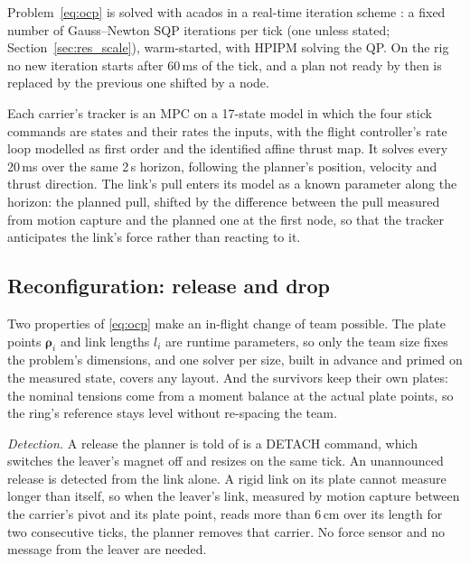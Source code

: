 Problem~\eqref{eq:ocp} is solved with acados \cite{verschueren2022acados} in a real-time iteration scheme
\cite{diehl2002rti}: a fixed number of Gauss--Newton SQP iterations per tick (one unless stated;
Section~\ref{sec:res_scale}), warm-started, with HPIPM \cite{frison2020hpipm}
solving the QP. On the rig no new iteration starts after 60\,ms of the tick, and a plan not ready by then is replaced
by the previous one shifted by a node.

Each carrier's tracker is an MPC on a 17-state model in which the four stick commands are states and their rates the
inputs, with the flight controller's rate loop modelled as first order and the identified affine thrust map. It
solves every 20\,ms over the same 2\,s horizon, following the planner's position, velocity and thrust direction. The
link's pull enters its model as a known parameter along the horizon: the planned pull, shifted by the difference
between the pull measured from motion capture and the planned one at the first node, so that the tracker anticipates
the link's force rather than reacting to it.

\subsection{Reconfiguration: release and drop}
\label{sec:reconfig}

Two properties of \eqref{eq:ocp} make an in-flight change of team possible. The plate points
$\boldsymbol{\rho}_i$ and link lengths $l_i$ are runtime parameters, so only the team size fixes the problem's
dimensions, and one solver per size, built in advance and primed on the measured state, covers any layout. And the
survivors keep their own plates: the nominal tensions come from a moment balance at the actual plate points, so the
ring's reference stays level without re-spacing the team.

\emph{Detection.} A release the planner is told of is a DETACH command, which switches the leaver's magnet off and
resizes on the same tick. An unannounced release is detected from the link alone. A rigid link on its plate cannot
measure longer than itself, so when the leaver's link, measured by motion capture between the carrier's pivot and
its plate point, reads more than 6\,cm over its length for two consecutive ticks, the planner removes that carrier.
No force sensor and no message from the leaver are needed.

